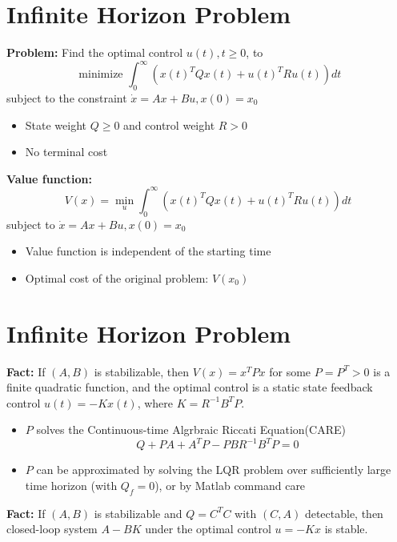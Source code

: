 \documentclass[10pt,a4paper,oneside]{article}
\begin{document}
\section{Infinite Horizon Problem}
{\bfseries Problem: }Find the optimal control $u(t),t\geqslant0$, to
$$
\text { minimize } \int_{0}^{\infty}\left(x(t)^{T} Q x(t)+u(t)^{T} R u(t)\right) d t
$$
subject to the constraint $\dot{x}=Ax+Bu, x(0)=x_0$
\begin{itemize}
\item State weight $Q\geqslant0$ and control weight $R>0$
\item No terminal cost
\end{itemize}
{\bfseries Value function:}
$$
V(x)=\min _{u} \int_{0}^{\infty}\left(x(t)^{T} Q x(t)+u(t)^{T} R u(t)\right) d t
$$
subject to  $\dot{x}=Ax+Bu, x(0)=x_0$
\begin{itemize}
\item Value function is independent of the starting time
\item Optimal cost of the original problem: $V(x_0)$
\end{itemize}
\section{Infinite Horizon Problem}
{\bfseries Fact:} If $(A, B)$  is stabilizable, then $V(x)=x^{T} P x$   for some $P=P^{T}>0$ is a finite quadratic function, and the optimal control is a static state feedback control $u(t)=-Kx(t)$, where $K=R^{-1}B^TP$.
\begin{itemize}
\item $P$ solves the Continuous-time Algrbraic Riccati Equation(CARE)
$$
Q+P A+A^{T} P-P B R^{-1} B^{T} P=0
$$
\item $P$ can be approximated by solving the LQR problem over sufficiently large time horizon (with $Q_f=0$), or by Matlab command care
\end{itemize}
{\bfseries Fact:} If $(A, B)$  is stabilizable and $Q=C^TC$ with $(C,A)$ detectable, then closed-loop system $A-BK$ under the optimal control $u=-Kx$ is stable.
\end{document}
